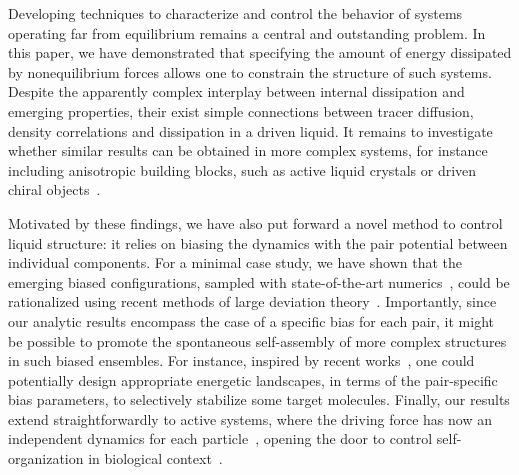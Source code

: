 \documentclass[pre, superscriptaddress, twocolumn,pre]{revtex4-1}
\begin{document}
Developing techniques to characterize and control the behavior of systems operating far from equilibrium remains a central and outstanding problem. In this paper, we have demonstrated that specifying the amount of energy dissipated by nonequilibrium forces allows one to constrain the structure of such systems. Despite the apparently complex interplay between internal dissipation and emerging properties, their exist simple connections between tracer diffusion, density correlations and dissipation in a driven liquid. It remains to investigate whether similar results can be obtained in more complex systems, for instance including anisotropic building blocks, such as active liquid crystals or driven chiral objects~\cite{Joshi2017, vanZuiden2016, Nguyen2014b}.


Motivated by these findings, we have also put forward a novel method to control  liquid structure: it relies on biasing the dynamics with the pair potential between individual components. For a minimal case study, we have shown that the emerging biased configurations, sampled with state-of-the-art numerics~\cite{Giadina2006, tailleur2007probing, Hurtado2009, Nemoto2016, Ray2018, Klymko2018, Brewer2018}, could be rationalized using recent methods of large deviation theory~\cite{Chetrite2013, Jack2010}. Importantly, since our analytic results encompass the case of a specific bias for each pair, it might be possible to promote the spontaneous self-assembly of more complex structures in such biased ensembles. For instance, inspired by recent works~\cite{Murugan2015, Murugan2017b}, one could potentially design appropriate energetic landscapes, in terms of the pair-specific bias parameters, to selectively stabilize some target molecules. Finally, our results extend straightforwardly to active systems, where the driving force has now an independent dynamics for each particle~\cite{Marchetti2013, Cates2015, Bechinger2016, Marchetti2018}, opening the door to control self-organization in biological context~\cite{Sperandio2002, Brown2011, Betz2018}.




\end{document}
